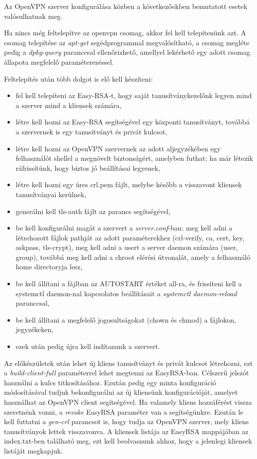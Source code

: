 
Az OpenVPN szerver konfigurálása közben a következőekben bemutatott esetek valósulhatnak meg. 

Ha nincs még feltelepítve az openvpn csomag, akkor fel kell telepítenünk azt. A csomag telepítése az \textit{apt-get} segédprogrammal megvalósítható, a csomag megléte pedig a \textit{dpkg-query} paranccsal ellenőrizhető, amellyel lekérhető egy adott csomag állapota megfelelő paraméterezéssel.

Feltelepítés után több dolgot is elő kell készíteni:
\begin{itemize}
	\item fel kell telepíteni az Easy-RSA-t, hogy saját tanusítványkezelőnk legyen mind a szerver mind a kliensek számára,
	\item létre kell hozni az Easy-RSA segítségével egy központi tanusítványt, továbbá a szervernek is egy tanusítványt és privát kulcsot,
	\item létre kell hozni az OpenVPN szervernek az \textit{} adott aljegyzékében egy felhasználót \textit{} shellel a megnövelt biztonságért, amelyben futhat; ha már létezik ráfrissítünk, hogy biztos jó beállításai legyenek,
	\item létre kell hozni egy üres crl.pem fájlt, melybe később a visszavont kliensek tanusítványai kerülnek,
	\item generálni kell tls-auth fájlt az \textit{} parancs segítségével,
	\item be kell konfigurálni magát a szervert a \textit{server.conf}-ban: meg kell adni a létrehozott fájlok pathját az adott paraméterekhez (crl-verify, ca, cert, key, askpass, tls-crypt), meg kell adni a usert a server daemon számára (user, group), továbbá meg kell adni a chroot elérési útvonalát, amely a felhasználó home directoryja lesz,
	\item be kell állítani a \textit{} fájlban az AUTOSTART értéket all-ra, és frissíteni kell a systemctl daemon-nal kapcsolatos beállításait a \textit{systemctl daemon-reload} paranccsal,
	\item be kell állítani a megfelelő jogosultságokat (chown és chmod) a fájlokon, jegyzékeken,
	\item ezek után pedig újra kell indítanunk a szervert.
\end{itemize}

Az előkészületek után lehet új kliens tanusítványt és privát kulcsot létrehozni, ezt a \textit{build-client-full} paraméterrel lehet megtenni az EasyRSA-ban. Célszerű jelszót használni a kulcs titkosításához. Ezután pedig egy minta konfiguráció módosításával tudjuk bekonfigurálni az új kliensünk konfigurációját, amelyet használhat az OpenVPN client segítségével. Ha valamely kliens hozzáférést vissza szeretnénk vonni, a \textit{revoke} EasyRSA paraméter van a segítségünkre. Ezután le kell futtatni a \textit{gen-crl} parancsot is, hogy tudja az OpenVPN szerver, mely kliens tanusítványok lettek visszavonva. A kliensek listája az EasyRSA mappájában az index.txt-ben található meg, ezt kell beolvasnunk ahhoz, hogy a jelenlegi kliensek listáját megkapjuk.

